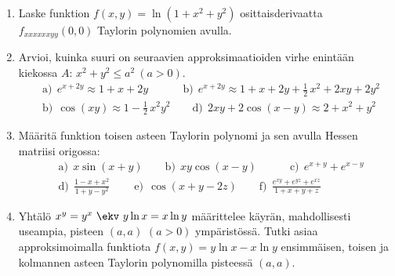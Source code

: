 \begin{enumerate}
\item
Laske funktion $f(x,y)=\ln(1+x^2+y^2)$ osittaisderivaatta $f_{xxxxxxyy}(0,0)$ Taylorin
polynomien avulla.

\item
Arvioi, kuinka suuri on seuraavien approksimaatioiden virhe enintään kiekossa
$A:\,x^2+y^2 \le a^2\ (a>0)$.
\begin{align*}
&\text{a)}\ \ e^{x+2y} \approx 1+x+2y \qquad\quad\,
 \text{b)}\ \ e^{x+2y} \approx 1+x+2y+\frac{1}{2}\,x^2+2xy+2y^2 \\
&\text{b)}\ \ \cos(xy)\approx 1-\frac{1}{2}\,x^2y^2 \qquad
 \text{d)}\ \ 2xy+2\cos(x-y) \approx 2+x^2+y^2
\end{align*}

\item
Määritä funktion toisen asteen Taylorin polynomi ja sen avulla Hessen matriisi
origossa:
\begin{align*}
&\text{a)}\ \ x\sin(x+y) \qquad
 \text{b)}\ \ xy\cos(x-y) \qquad\quad
 \text{c)}\ \ e^{x+y}+e^{x-y} \\
&\text{d)}\ \ \frac{1-x+x^2}{1+y-y^2} \qquad\
 \text{e)}\ \ \cos(x+y-2z) \qquad
 \text{f)}\ \ \frac{e^{xy}+e^{yz}+e^{xz}}{1+x+y+z}
\end{align*}

\item
Yhtälö $x^y = y^x\ \ekv\ y \ln x = x \ln y$ määrittelee käyrän, mahdollisesti useampia, pisteen
$(a, a)$ $(a > 0)$ ympäristössä. Tutki asiaa approksimoimalla funktiota 
$f(x, y) =  y \ln x - x \ln y$ ensimmäisen, toisen ja kolmannen asteen Taylorin polynomilla 
pisteessä $(a, a)$.

\end{enumerate}